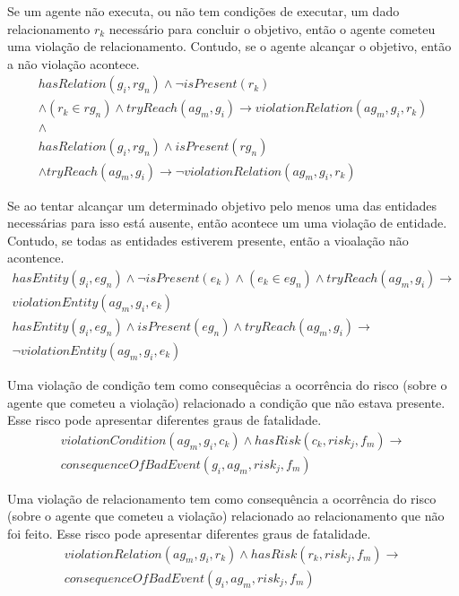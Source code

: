 \documentclass[12pt]{article}
\begin{document}
Se um agente não executa, ou não tem condições de executar, um dado relacionamento $r_k$ necessário para concluir o objetivo, então o agente cometeu uma violação de relacionamento. Contudo, se o agente alcançar o objetivo, então a não violação acontece. 
\begin{eqnarray}\label{rel4}\nonumber
	hasRelation(g_i,rg_n)\wedge \neg isPresent(r_k)  \nonumber \\ 
	\wedge (r_k \in rg_n) \wedge tryReach(ag_m,g_i) \to violationRelation(ag_m,g_i,r_k) \nonumber \\
	\wedge \nonumber
	\\
	hasRelation(g_i,rg_n)\wedge isPresent(rg_n)  \nonumber \\ 
	 \wedge tryReach(ag_m,g_i) \to  \neg violationRelation(ag_m,g_i,r_k) 
\end{eqnarray}

Se ao tentar alcançar um determinado objetivo pelo menos uma das entidades necessárias para isso está ausente, então acontece um uma violação de entidade. Contudo, se todas as entidades estiverem presente, então a vioalação não acontence. 
\begin{eqnarray}\label{rel5}\nonumber
	hasEntity(g_i,eg_n) \wedge \neg isPresent(e_k) 	\wedge (e_k \in eg_n) \wedge tryReach(ag_m,g_i) \to \nonumber \\ violationEntity(ag_m,g_i,e_k) \nonumber \\
	hasEntity(g_i,eg_n) \wedge  isPresent(eg_n) \wedge tryReach(ag_m,g_i) \to \nonumber \\ \neg violationEntity(ag_m,g_i,e_k)  
\end{eqnarray}


Uma violação de condição tem como consequêcias a ocorrência do risco (sobre o agente que cometeu a violação) relacionado a condição que não estava presente. Esse risco pode apresentar diferentes graus de fatalidade.
\begin{eqnarray}\label{rel9}\nonumber
	violationCondition(ag_m,g_i,c_k)  \wedge hasRisk(c_k,risk_j,f_m) \to \\ 
	consequenceOfBadEvent(g_i,ag_m,risk_j,f_m)
\end{eqnarray}

Uma violação de relacionamento tem como consequência a ocorrência do risco (sobre o agente que cometeu a violação) relacionado ao relacionamento que não foi feito. Esse risco pode apresentar diferentes graus de fatalidade.
\begin{eqnarray}\label{rel10}\nonumber
	violationRelation(ag_m,g_i,r_k) \wedge hasRisk(r_k,risk_j,f_m) \to \\ 
	consequenceOfBadEvent(g_i,ag_m,risk_j,f_m)
\end{eqnarray}
\end{document}
